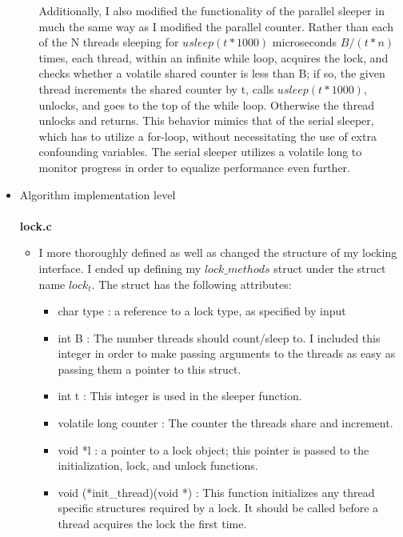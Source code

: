 \documentclass[]{article}
\begin{document}
\begin{itemize}
\begin{itemize}
		Additionally, I also modified the functionality of the parallel sleeper in much the same way as I modified the parallel counter. Rather than each of the N threads sleeping for $usleep(t * 1000)$ microseconds $B / (t * n)$ times, each thread, within an infinite while loop, acquires the lock, and checks whether a  volatile shared counter is less than B; if so, the given thread increments the shared counter by t,  calls $usleep(t * 1000)$, unlocks, and goes to the top of the while loop. Otherwise the thread unlocks and returns.
		This behavior mimics that of the serial sleeper, which has to utilize a for-loop, without necessitating the use of extra confounding variables. The serial sleeper utilizes a volatile long to monitor progress in order to equalize performance even further.
	\end{itemize}
	\item Algorithm implementation level
	\\\\
	\textbf{lock.c}
	\begin{itemize}
		\item  I more thoroughly defined as well as changed the structure of my locking interface. I ended up defining my $lock\_methods$ struct under the struct name $lock_t$. The struct has the following attributes:
		\begin{itemize}
			\item char type : a reference to a lock type, as specified by input
			
			\item int B : The number threads should count/sleep to. I included this integer in order to make passing arguments to the threads as easy as passing them a pointer to this struct.
			
			
			\item int t : This integer is used in the sleeper function. 
			
			\item volatile long counter : The counter the threads share and increment.
			
			\item void *l : a pointer to a lock object; this pointer is passed to the initialization, lock, and unlock functions.
			
			\item void (*init\_thread)(void *) : This function initializes any thread specific structures required by a lock. It should be called before a thread acquires the lock the first time.
			

\end{itemize}
\end{itemize}
\end{itemize}
\end{document}
